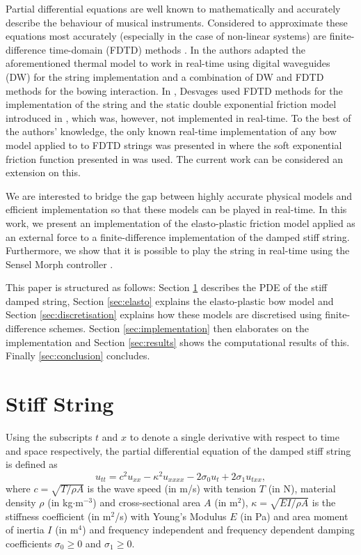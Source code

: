\documentclass[twoside,a4paper]{article}
\begin{document}
Partial differential equations are well known to mathematically and accurately describe the behaviour of musical instruments. Considered to approximate these equations most accurately (especially in the case of non-linear systems) are finite-difference time-domain (FDTD) methods \cite{Bilbao2009, Bilbao2018}. In \cite{Maestre2014} the authors adapted the aforementioned thermal model to work in real-time using digital waveguides (DW) for the string implementation and a combination of DW and FDTD methods for the bowing interaction. In \cite{Desvages2017}, Desvages used FDTD methods for the implementation of the string and the static double exponential friction model introduced in \cite{Smith2000}, which was, however, not implemented in real-time. To the best of the authors' knowledge, the only known real-time implementation of any bow model applied to to FDTD strings was presented in \cite{Willemsen2019} where the soft exponential friction function presented in \cite{Bilbao2009} was used. The current work can be considered an extension on this.

We are interested to bridge the gap between highly accurate physical models and efficient implementation so that these models can be played in real-time. In this work, we present an implementation of the elasto-plastic friction model applied as an external force to a finite-difference implementation of the damped stiff string. Furthermore, we show that it is possible to play the string in real-time using the Sensel Morph controller \cite{Sensel2019}.

This paper is structured as follows: Section \ref{sec:stiffString} describes the PDE of the stiff damped string, Section \ref{sec:elasto} explains the elasto-plastic bow model and Section \ref{sec:discretisation} explains how these models are discretised using finite-difference schemes. Section \ref{sec:implementation} then elaborates on the implementation and Section \ref{sec:results} shows the computational results of this. Finally \ref{sec:conclusion} concludes.

\section{Stiff String}\label{sec:stiffString}
Using the subscripts $t$ and $x$ to denote a single derivative with respect to time and space respectively, the partial differential equation of the damped stiff string is defined as \cite{Bilbao2009}
\begin{equation}\label{eq:PDE}
    u_{tt} = c^2u_{xx}-\kappa^2u_{xxxx}-2\sigma_0u_t+2\sigma_1u_{txx},
\end{equation}
where $c = \sqrt{T/\rho A}$ is the wave speed (in m/s) with tension $T$ (in N), material density $\rho$ (in kg$\cdot$m$^{-3}$) and cross-sectional area $A$ (in m$^2$), $\kappa = \sqrt{EI/\rho A}$ is the stiffness coefficient (in m$^2$/s) with Young's Modulus $E$ (in Pa) and area moment of inertia $I$ (in m$^4$) and frequency independent and frequency dependent damping coefficients $\sigma_0 \geq 0$ and $\sigma_1 \geq 0$.
\end{document}
